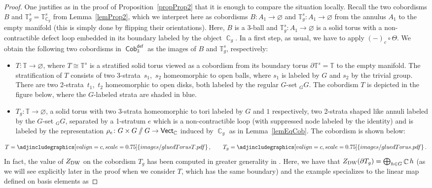 \documentclass[pdftex]{sigma}
\DeclareMathOperator{\vect}{\mathsf{Vect}}
\DeclareMathOperator{\C}{\mathbb{C}}
\DeclareMathOperator{\Cob}{\mathsf{Cob}}
\newcommand{\sslash}{\mathbin{/\mkern-6mu/}}
\numberwithin{equation}{section}
\theoremstyle{definition}
\begin{document}
\begin{proof}
 One justifies as in the proof of Proposition~\ref{propProp2} that it is enough to compare the situation locally. Recall the two cobordisms $B$ and $\mathbb{T}_g^s = \mathbb{T}_{\C_g}^s$ from Lemma~\ref{lemProp2}, which we interpret here as cobordisms $B\colon A_1 \rightarrow \varnothing$ and $\mathbb{T}_g^s\colon A_1 \rightarrow \varnothing$ from the annulus $A_1$ to the empty manifold (this is simply done by flipping their orientations). Here, $B$ is a 3-ball and $\mathbb{T}_g^s\colon A_1 \rightarrow \varnothing$ is a solid torus with a non-contractible defect loop embedded in its boundary labeled by the object $\C_g$.
 In a first step, as usual, we have to apply $(-)_c \circ \Theta$. We obtain the following two cobordisms in $\Cob_3^{\mathsf{def}}$ as the images of $B$ and $\mathbb{T}_g^s$, respectively:
 \begin{itemize}\itemsep=0pt
 \item $T\colon \mathbb{T} \rightarrow \varnothing$, where $T \cong \mathbb{T}^s$ is a stratified solid torus viewed as a cobordism from its boundary torus $\partial \mathbb{T}^s = \mathbb{T}$ to the empty manifold. The stratification of $T$ consists of two 3-strata~$s_1$,~$s_2$ homeomorphic to open balls, where $s_1$ is labeled by $G$ and $s_2$ by the trivial group. There are two 2-strata~$t_1$,~$t_2$ homeomorphic to open disks, both labeled by the regular $G$-set $_G G$. The cobordism $T$ is depicted in the figure below, where the $G$-labeled strata are shaded in blue.
 \item $T_g\colon \mathbb{T} \rightarrow \varnothing$, a solid torus with two 3-strata homeomorphic to tori labeled by $G$ and $1$ respectively, two 2-strata shaped like annuli labeled by the $G$-set $_GG$, separated by a 1-stratum $e$ which is a non-contractible loop (with suppressed node labeled by the identity) and is labeled by the representation $\rho_e\colon G \times G \sslash G \rightarrow \vect_{\C}$ induced by $\C_g$ as in Lemma~\ref{lemEqCob}. The cobordism is shown below:
 \end{itemize}
 \begin{align*}
 T = \adjincludegraphics[valign=c, scale = 0.75]{images/gluedTorusT.pdf}\,, \qquad T_g = \adjincludegraphics[valign=c, scale = 0.75]{images/gluedTorus.pdf}\,.
 \end{align*}
 In fact, the value of $Z_{\rm DW}$ on the cobordism $T_g$ has been computed in greater generality in \cite[Example~7.10]{FMM}. Here, we have that $Z_{\rm DW}(\partial T_g) = \bigoplus_{h \in G} \C h$ (as we will see explicitly later in the proof when we consider $T$, which has the same boundary) and the example specializes to the linear map defined on basis elements as

\end{proof}
\end{document}
